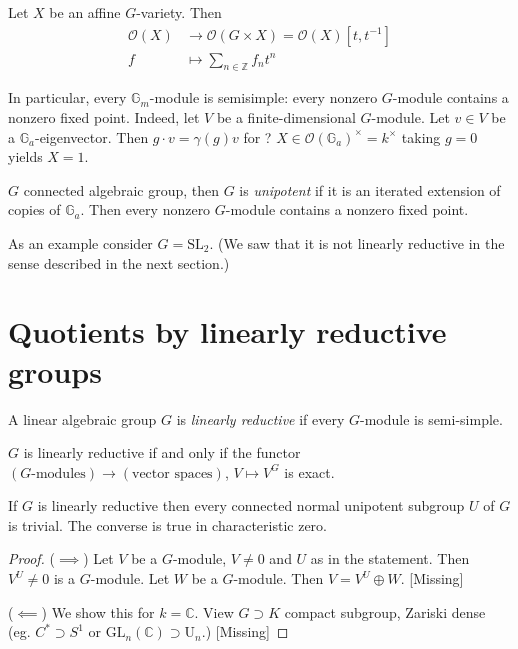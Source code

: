 Let $X$ be an affine $G$-variety. Then
\begin{align*}
\mathcal{O}(X) &\longrightarrow \mathcal{O}(G\times X)
=\mathcal{O}(X)[t,t^{-1}] \\
f &\longmapsto \sum_{n \in \mathbb{Z}}f_n t^n
\end{align*}

In particular, every $\mathbb{G}_m$-module is semisimple: every nonzero
$G$-module contains a nonzero fixed point. Indeed, let $V$ be a
finite-dimensional $G$-module. Let $v \in V$ be a $\mathbb{G}_a$-eigenvector.
Then $g\cdot v=\gamma(g)v$ for ? $X \in
\mathcal{O}(\mathbb{G}_a)^{\times}=k^{\times}$ taking $g=0$ yields $X=1$.

$G$ connected algebraic group, then $G$ is {\it unipotent} if it is an iterated
extension of copies of $\mathbb{G}_a$. Then every nonzero $G$-module contains a
nonzero fixed point.

As an example consider $G=\text{SL}_2$. (We saw that it is not linearly
reductive in the sense described in the next section.)

\section{Quotients by linearly reductive groups}
\label{section-quotients-by-linearly-reductive-groups}

\begin{definition}
\label{definition-linearly-reductive-group}
A linear algebraic group $G$ is {\it linearly reductive} if every $G$-module is
semi-simple.
\end{definition}

\begin{exercise}
\label{exercise-linearly-reductive-characterization}
$G$ is linearly reductive if and only if the functor 
$(\text{$G$-modules})\to(\text{vector spaces})$, $V \mapsto V^G$ is exact.
\end{exercise}

\begin{theorem}
\label{theorem-linearly-reductive-normal-unipotent-connected-subgroups-are-
trivial}
 If $G$ is linearly reductive then every connected normal unipotent subgroup $U$ 
of $G$ is trivial. The converse is true in characteristic zero.
\end{theorem}

\begin{proof}
($\implies$) Let $V$ be a $G$-module, $V\neq 0$ and $U$ as in the statement.
Then $V^U\neq 0$ is a $G$-module. Let $W$ be a $G$-module. 
Then $V=V^U \oplus W$. [Missing]

($\impliedby$) We show this for $k= \mathbb{C}$. View $G \supset K$ compact
subgroup, Zariski dense (eg. $C^* \supset S^1$ or 
$\text{GL}_n(\mathbb{C})\supset \text{U}_n$.) [Missing]
\end{proof}

